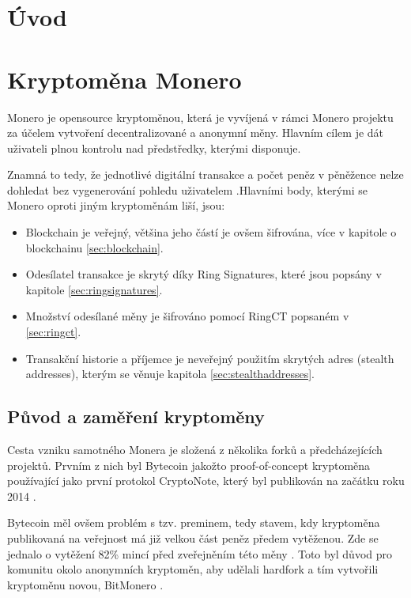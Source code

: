 \documentclass[
  printed, %
  table,   %
  nolof,     %
  nolot,     %
           oneside, color
]{fithesis3}
\begin{document}
\chapter{Úvod}
\chapter{Kryptoměna Monero}
Monero je opensource kryptoměnou, která je vyvíjená v rámci Monero projektu za účelem vytvoření decentralizované a anonymní měny. Hlavním cílem je dát uživateli plnou kontrolu nad předstředky, kterými disponuje. 

Znamná to tedy, že jednotlivé digitální transakce a počet peněz v pěněžence nelze dohledat bez vygenerování pohledu uživatelem \cite{moneroprojectgithub}.Hlavními body, kterými se Monero oproti jiným kryptoměnám liší, jsou:
\begin{itemize}\itemsep0em
\item Blockchain je veřejný, většina jeho částí je ovšem šifrována, více v kapitole o blockchainu \ref{sec:blockchain}.
\item Odesílatel transakce je skrytý díky Ring Signatures, které jsou popsány v kapitole \ref{sec:ringsignatures}.
\item Množství odesílané měny je šifrováno pomocí RingCT popsaném v \ref{sec:ringct}.
\item Transakční historie a příjemce je neveřejný použitím skrytých adres (stealth addresses), kterým se věnuje kapitola \ref{sec:stealthaddresses}.
\end{itemize}
\section{Původ a zaměření kryptoměny}
Cesta vzniku samotného Monera je složená z několika forků a předcházejících projektů. Prvním z nich byl Bytecoin jakožto proof-of-concept kryptoměna používající jako první protokol CryptoNote, který byl publikován na začátku roku 2014 \cite{githubbytecoin}.

Bytecoin měl ovšem problém s tzv. preminem, tedy stavem, kdy kryptoměna publikovaná na veřejnost má již velkou část peněz předem vytěženou. Zde se jednalo o vytěžení 82\% mincí před zveřejněním této měny \cite{fluffyponyonbytecoin}.
Toto byl důvod pro komunitu okolo anonymních kryptoměn, aby udělali hardfork a tím vytvořili kryptoměnu novou, BitMonero \cite{bitmonero}.
\end{document}
